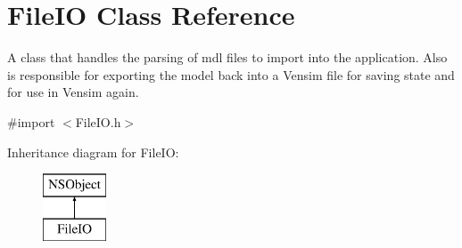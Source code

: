 \hypertarget{interface_file_i_o}{\section{File\-I\-O Class Reference}
\label{interface_file_i_o}
}


A class that handles the parsing of mdl files to import into the application. Also is responsible for exporting the model back into a Vensim file for saving state and for use in Vensim again.  




{\ttfamily \#import $<$File\-I\-O.\-h$>$}

Inheritance diagram for File\-I\-O\-:\begin{figure}[H]
\begin{center}
\leavevmode
\includegraphics[height=2.000000cm]{interface_file_i_o}
\end{center}
\end{figure}
